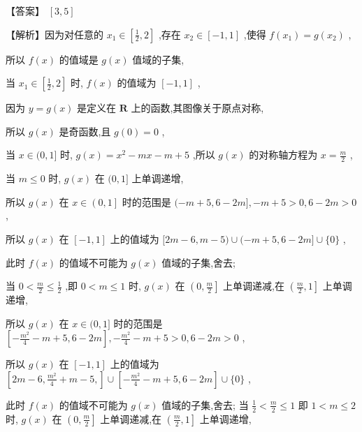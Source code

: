 \documentclass[10pt]{article}
\begin{document}
【答案】 \(\left\lbrack  {3,5}\right\rbrack\)

【解析】因为对任意的 \({x}_{1} \in  \left\lbrack  {\frac{1}{2},2}\right\rbrack\) ,存在 \({x}_{2} \in  \left\lbrack  {-1,1}\right\rbrack\) ,使得 \(f\left( {x}_{1}\right)  = g\left( {x}_{2}\right)\) ,

所以 \(f\left( x\right)\) 的值域是 \(g\left( x\right)\) 值域的子集,

当 \({x}_{1} \in  \left\lbrack  {\frac{1}{2},2}\right\rbrack\) 时, \(f\left( x\right)\) 的值域为 \(\left\lbrack  {-1,1}\right\rbrack\) ,

因为 \(y = g\left( x\right)\) 是定义在 \(\mathbf{R}\) 上的函数,其图像关于原点对称,

所以 \(g\left( x\right)\) 是奇函数,且 \(g\left( 0\right)  = 0\) ,

当 \(x \in  (0,1\rbrack\) 时, \(g\left( x\right)  = {x}^{2} - {mx} - m + 5\) ,所以 \(g\left( x\right)\) 的对称轴方程为 \(x = \frac{m}{2}\) ,

当 \(m \leq  0\) 时, \(g\left( x\right)\) 在 \((0,1\rbrack\) 上单调递增,

所以 \(g\left( x\right)\) 在 \(x \in  \left( {0,1}\right\rbrack\) 时的范围是 \(( - m + 5,6 - {2m}\rbrack , - m + 5 > 0,6 - {2m} > 0\) ,

所以 \(g\left( x\right)\) 在 \(\left\lbrack  {-1,1}\right\rbrack\) 上的值域为 \(\lbrack {2m} - 6,m - 5) \cup  ( - m + 5,6 - {2m}\rbrack  \cup  \{ 0\}\) ,

此时 \(f\left( x\right)\) 的值域不可能为 \(g\left( x\right)\) 值域的子集,舍去;

当 \(0 < \frac{m}{2} \leq  \frac{1}{2}\) ,即 \(0 < m \leq  1\) 时, \(g\left( x\right)\) 在 \(\left( {0,\frac{m}{2}}\right\rbrack\) 上单调递减,在 \(\left( {\frac{m}{2},1}\right\rbrack\) 上单调递增,

所以 \(g\left( x\right)\) 在 \(x \in  (0,1\rbrack\) 时的范围是 \(\left\lbrack  {-\frac{{m}^{2}}{4} - m + 5,6 - {2m}}\right\rbrack  , - \frac{{m}^{2}}{4} - m + 5 > 0,6 - {2m} > 0\) ,

所以 \(g\left( x\right)\) 在 \(\left\lbrack  {-1,1}\right\rbrack\) 上的值域为 \(\left\lbrack  {{2m} - 6,\frac{{m}^{2}}{4} + m - 5,}\right\rbrack   \cup  \left\lbrack  {-\frac{{m}^{2}}{4} - m + 5,6 - {2m}}\right\rbrack   \cup  \{ 0\}\) ,

此时 \(f\left( x\right)\) 的值域不可能为 \(g\left( x\right)\) 值域的子集,舍去; 当 \(\frac{1}{2} < \frac{m}{2} \leq  1\) 即 \(1 < m \leq  2\) 时, \(g\left( x\right)\) 在 \(\left( {0,\frac{m}{2}}\right\rbrack\) 上单调递减,在 \(\left( {\frac{m}{2},1}\right\rbrack\) 上单调递增,
\end{document}
